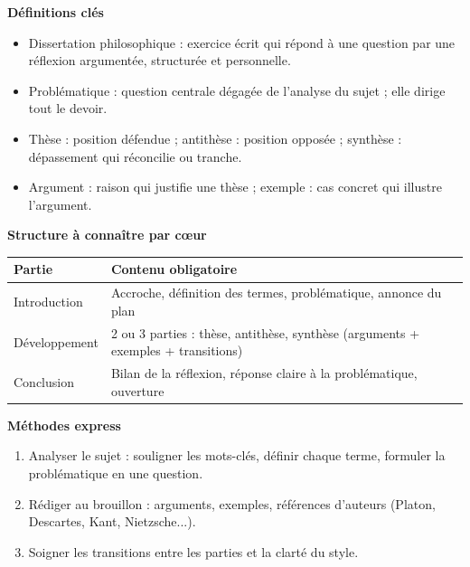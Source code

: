 \documentclass[11pt]{article}
\newcommand{\cle}[1]{{\popxbold\color{popdark}#1}}
\begin{document}
\begin{bilan}
\textbf{Définitions clés}
\begin{itemize}
\item \cle{Dissertation philosophique} : exercice écrit qui répond à une question par une réflexion argumentée, structurée et personnelle.
\item \cle{Problématique} : question centrale dégagée de l'analyse du sujet ; elle dirige tout le devoir.
\item \cle{Thèse} : position défendue ; \cle{antithèse} : position opposée ; \cle{synthèse} : dépassement qui réconcilie ou tranche.
\item \cle{Argument} : raison qui justifie une thèse ; \cle{exemple} : cas concret qui illustre l'argument.
\end{itemize}

\textbf{Structure à connaître par c\oe ur}
\begin{center}
\begin{tabularx}{\linewidth}{|l|X|}
\hline
\rowcolor{popblueL} \textbf{Partie} & \textbf{Contenu obligatoire} \\
\hline
Introduction & Accroche, définition des termes, problématique, annonce du plan \\
\hline
Développement & 2 ou 3 parties : thèse, antithèse, synthèse (arguments + exemples + transitions) \\
\hline
Conclusion & Bilan de la réflexion, réponse claire à la problématique, ouverture \\
\hline
\end{tabularx}
\end{center}

\textbf{Méthodes express}
\begin{enumerate}
\item Analyser le sujet : souligner les mots-clés, définir chaque terme, formuler la problématique en une question.
\item Rédiger au brouillon : arguments, exemples, références d'auteurs (Platon, Descartes, Kant, Nietzsche...).
\item Soigner les transitions entre les parties et la clarté du style.
\end{enumerate}
\end{bilan}
\end{document}
